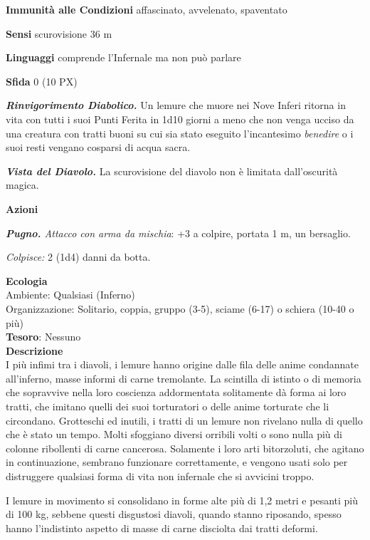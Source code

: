\begin{multicols}{2}
\textbf{Immunità alle Condizioni} affascinato, avvelenato, spaventato

\textbf{Sensi} scurovisione 36 m

\textbf{Linguaggi} comprende l'Infernale ma non può parlare

\textbf{Sfida} 0 (10 PX)

\textit{\textbf{Rinvigorimento Diabolico.}} Un lemure che muore nei Nove Inferi ritorna in vita con tutti i suoi Punti Ferita in 1d10 giorni a meno che non venga ucciso da una creatura con tratti buoni su cui sia stato eseguito l'incantesimo \textit{benedire} o i suoi resti vengano
cosparsi di acqua sacra.

\textit{\textbf{Vista del Diavolo.}} La scurovisione del diavolo non è limitata dall'oscurità magica.

\textbf{Azioni}

\textit{\textbf{Pugno.} Attacco con arma da mischia}: +3 a colpire, portata 1 m, un bersaglio.

\textit{Colpisce:} 2 (1d4) danni da botta.

\textbf{Ecologia}\\
Ambiente: Qualsiasi (Inferno)\\
Organizzazione: Solitario, coppia, gruppo (3-5), sciame (6-17) o schiera (10-40 o più)\\
\textbf{Tesoro}: Nessuno\\
\textbf{Descrizione}\\
I più infimi tra i diavoli, i lemure hanno origine dalle fila delle anime condannate all'inferno, masse informi di carne tremolante. La scintilla di istinto o di memoria che sopravvive nella loro coscienza addormentata solitamente dà forma ai loro tratti, che imitano quelli dei suoi torturatori o delle anime torturate che li circondano. Grotteschi ed inutili, i tratti di un lemure non rivelano nulla di quello che è stato un tempo. Molti sfoggiano diversi orribili volti o sono nulla più di colonne ribollenti di carne cancerosa. Solamente i loro arti bitorzoluti, che agitano in continuazione, sembrano funzionare correttamente, e vengono usati solo per distruggere qualsiasi forma di vita non infernale che si avvicini troppo.

I lemure in movimento si consolidano in forme alte più di 1,2 metri e pesanti più di 100 kg, sebbene questi disgustosi diavoli, quando stanno riposando, spesso hanno l'indistinto aspetto di masse di carne disciolta dai tratti deformi.


\end{multicols}
